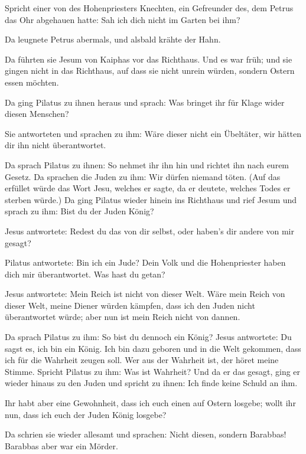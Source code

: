  Spricht einer von des Hohenpriesters Knechten, ein
Gefreunder des, dem Petrus das Ohr abgehauen hatte: Sah ich dich nicht
im Garten bei ihm?

 Da leugnete Petrus abermals, und alsbald krähte der
Hahn.

 Da führten sie Jesum von Kaiphas vor das Richthaus. Und
es war früh; und sie gingen nicht in das Richthaus, auf dass sie nicht
unrein würden, sondern Ostern essen möchten.

 Da ging Pilatus zu ihnen heraus und sprach: Was bringet
ihr für Klage wider diesen Menschen?

 Sie antworteten und sprachen zu ihm: Wäre dieser nicht
ein Übeltäter, wir hätten dir ihn nicht überantwortet.

 Da sprach Pilatus zu ihnen: So nehmet ihr ihn hin und
richtet ihn nach eurem Gesetz. Da sprachen die Juden zu ihm: Wir dürfen
niemand töten.  (Auf das erfüllet würde das Wort Jesu,
welches er sagte, da er deutete, welches Todes er sterben würde.)
 Da ging Pilatus wieder hinein ins Richthaus und rief
Jesum und sprach zu ihm: Bist du der Juden König?

 Jesus antwortete: Redest du das von dir selbst, oder
haben's dir andere von mir gesagt?

 Pilatus antwortete: Bin ich ein Jude? Dein Volk und die
Hohenpriester haben dich mir überantwortet. Was hast du getan?

 Jesus antwortete: Mein Reich ist nicht von dieser Welt.
Wäre mein Reich von dieser Welt, meine Diener würden kämpfen, dass ich
den Juden nicht überantwortet würde; aber nun ist mein Reich nicht von
dannen.

 Da sprach Pilatus zu ihm: So bist du dennoch ein König?
Jesus antwortete: Du sagst es, ich bin ein König. Ich bin dazu geboren
und in die Welt gekommen, dass ich für die Wahrheit zeugen soll. Wer aus
der Wahrheit ist, der höret meine Stimme.  Spricht
Pilatus zu ihm: Was ist Wahrheit? Und da er das gesagt, ging er wieder
hinaus zu den Juden und spricht zu ihnen: Ich finde keine Schuld an ihm.

 Ihr habt aber eine Gewohnheit, dass ich euch einen auf
Ostern losgebe; wollt ihr nun, dass ich euch der Juden König losgebe?

 Da schrien sie wieder allesamt und sprachen: Nicht
diesen, sondern Barabbas! Barabbas aber war ein Mörder.

